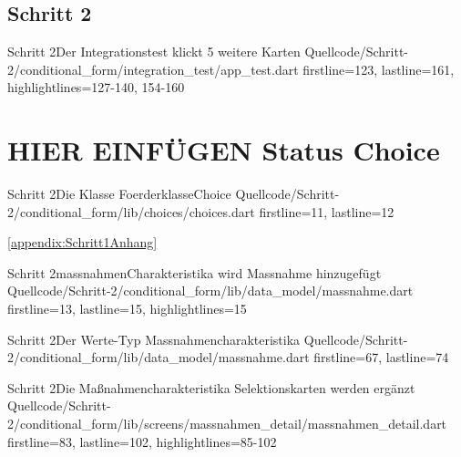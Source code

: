 \clearpage 

\subsection{Schritt 2}

\begin{alexlisting}{Schritt 2}{Der Integrationstest klickt 5 weitere Karten}
  {Quellcode/Schritt-2/conditional_form/integration_test/app_test.dart}
  {firstline=123, lastline=161, highlightlines={127-140, 154-160}}
  \label{lst:IntegrationstestKlickt5WeitereKarten}
\end{alexlisting}

\section{HIER EINFÜGEN Status Choice}

\begin{alexlisting}{Schritt 2}{Die Klasse FoerderklasseChoice}
  {Quellcode/Schritt-2/conditional_form/lib/choices/choices.dart}
  {firstline=11, lastline=12}
  \label{lst:Schritt2KlasseFoerderklasseChoice}
\end{alexlisting}

 \ref{appendix:Schritt1Anhang} 



\begin{alexlisting}{Schritt 2}{massnahmenCharakteristika wird Massnahme hinzugefügt}
  {Quellcode/Schritt-2/conditional_form/lib/data_model/massnahme.dart}
  {firstline=13, lastline=15, highlightlines={15}}
  \label{lst:Schritt2massnahmenCharakteristika wird Massnahme hinzugefügt}
\end{alexlisting}


\begin{alexlisting}{Schritt 2}{Der Werte-Typ Massnahmencharakteristika}
  {Quellcode/Schritt-2/conditional_form/lib/data_model/massnahme.dart}
  {firstline=67, lastline=74}
  \label{lst:Schritt2WerteTypMassnahmencharakteristika}
\end{alexlisting}

\begin{alexlisting}{Schritt 2}{Die Maßnahmencharakteristika Selektionskarten werden ergänzt}
  {Quellcode/Schritt-2/conditional_form/lib/screens/massnahmen_detail/massnahmen_detail.dart}
  {firstline=83, lastline=102, highlightlines={85-102}}
  \label{lst:Schritt2MaßnahmencharakteristikaSelektionskartenWerdenErgaenzt}
\end{alexlisting}




